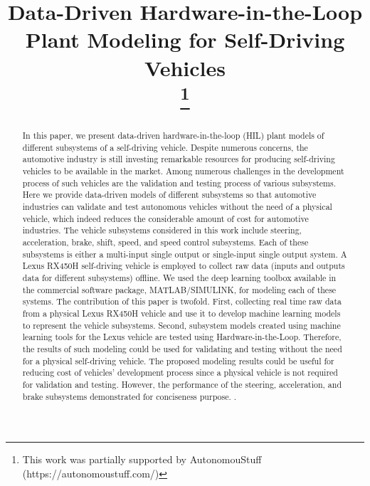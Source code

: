 \documentclass[conference]{IEEEtran}
\begin{document}
\title{Data-Driven Hardware-in-the-Loop Plant Modeling for Self-Driving Vehicles\\
\thanks{This work was partially supported by AutonomouStuff (https://autonomoustuff.com/)}
}


\author{
}

\maketitle

\begin{abstract}

  In this paper, we present data-driven hardware-in-the-loop (HIL) plant models of different subsystems of a self-driving vehicle. Despite numerous concerns, the automotive industry is still investing remarkable resources for producing self-driving vehicles to be available in the market. Among numerous challenges in the development process of such vehicles are the validation and testing process of various subsystems. Here we provide data-driven models of different subsystems so that automotive industries can validate and test autonomous vehicles without the need of a physical vehicle, which indeed reduces the considerable amount of cost for automotive industries. The vehicle subsystems considered in this work include steering, acceleration, brake, shift, speed, and speed control subsystems. Each of these subsystems is either a multi-input single output or single-input single output system. A Lexus RX450H self-driving vehicle is employed to collect raw data (inputs and outputs data for different subsystems) offline. We used the deep learning toolbox available in the commercial software package, MATLAB/SIMULINK, for modeling each of these systems. The contribution of this paper is twofold. First, collecting real time raw data from a physical Lexus RX450H vehicle and use it to develop machine learning models to represent the vehicle subsystems. Second, subsystem models created using machine learning tools for the Lexus vehicle are tested using Hardware-in-the-Loop. Therefore, the results of such modeling could be used for validating and testing without the need for a physical self-driving vehicle. The proposed modeling results could be useful for reducing cost of vehicles' development process since a physical vehicle is not required for validation and testing. However, the performance of the steering, acceleration, and brake subsystems demonstrated for conciseness purpose. .

\end{abstract}
\end{document}
